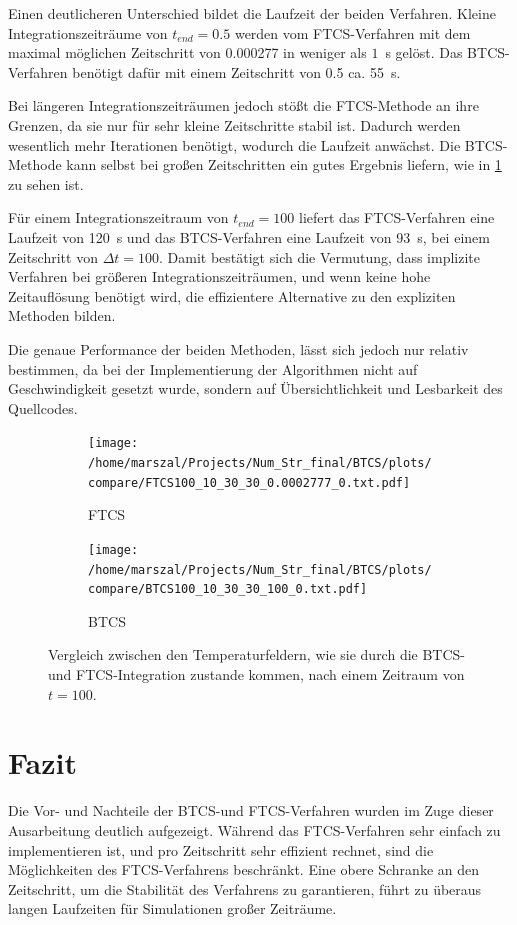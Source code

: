 Einen deutlicheren Unterschied bildet die Laufzeit der beiden Verfahren. Kleine Integrationszeiträume von $t_{end}=0.5$ werden vom FTCS-Verfahren mit dem maximal möglichen Zeitschritt von 0.000277 in weniger als $1$~s gelöst. Das BTCS-Verfahren benötigt dafür mit einem Zeitschritt von 0.5 ca. 55~s.

Bei längeren Integrationszeiträumen jedoch stößt die FTCS-Methode an ihre Grenzen, da sie nur für sehr kleine Zeitschritte stabil ist.
Dadurch werden wesentlich mehr Iterationen benötigt, wodurch die Laufzeit anwächst.
Die BTCS-Methode kann selbst bei großen Zeitschritten ein gutes Ergebnis liefern, wie in \cref{fig:vergleich2} zu sehen ist.

Für einem Integrationszeitraum von $t_{end}=100$ liefert das FTCS-Verfahren eine Laufzeit von 120~s und das BTCS-Verfahren eine Laufzeit von 93~s, bei einem Zeitschritt von $\Delta t = 100$.
Damit bestätigt sich die Vermutung, dass implizite Verfahren bei größeren Integrationszeiträumen, und wenn keine hohe Zeitauflösung benötigt wird, die effizientere Alternative zu den expliziten Methoden bilden.

Die genaue Performance der beiden Methoden, lässt sich jedoch nur relativ bestimmen, da bei der Implementierung der Algorithmen nicht auf Geschwindigkeit gesetzt wurde, sondern auf Übersichtlichkeit und Lesbarkeit des Quellcodes.

\begin{figure}
\centering
  \begin{subfigure}[b]{0.5\textwidth}\caption{FTCS}
    \texttt{[image: /home/marszal/Projects/Num\_Str\_final/BTCS/plots/compare/FTCS100\_10\_30\_30\_0.0002777\_0.txt.pdf]}
  \end{subfigure}
  \hspace{-0.5cm}
  \begin{subfigure}[b]{0.5\textwidth}\caption{BTCS}
    \texttt{[image: /home/marszal/Projects/Num\_Str\_final/BTCS/plots/compare/BTCS100\_10\_30\_30\_100\_0.txt.pdf]}
  \end{subfigure}
  \caption{Vergleich zwischen den Temperaturfeldern, wie sie durch die BTCS- und FTCS-Integration zustande kommen, nach einem Zeitraum von $t=100$.}\label{fig:vergleich2}
\end{figure}
\newpage
\section{Fazit}
Die Vor- und Nachteile der BTCS-und FTCS-Verfahren wurden im Zuge dieser Ausarbeitung deutlich aufgezeigt.
Während das FTCS-Verfahren sehr einfach zu implementieren ist, und pro Zeitschritt sehr effizient rechnet, sind die Möglichkeiten des FTCS-Verfahrens beschränkt. Eine obere Schranke an den Zeitschritt, um die Stabilität des Verfahrens zu garantieren, führt zu überaus langen Laufzeiten für Simulationen großer Zeiträume.

